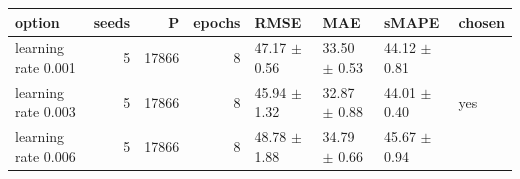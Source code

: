 \begin{tabular}{lrrrllll}
\toprule
option & seeds & P & epochs & RMSE & MAE & sMAPE & chosen \\
\midrule
learning rate 0.001 & 5 & 17866 & 8 & 47.17 $\pm$ 0.56 & 33.50 $\pm$ 0.53 & 44.12 $\pm$ 0.81 &  \\
learning rate 0.003 & 5 & 17866 & 8 & 45.94 $\pm$ 1.32 & 32.87 $\pm$ 0.88 & 44.01 $\pm$ 0.40 & yes \\
learning rate 0.006 & 5 & 17866 & 8 & 48.78 $\pm$ 1.88 & 34.79 $\pm$ 0.66 & 45.67 $\pm$ 0.94 &  \\
\bottomrule
\end{tabular}
